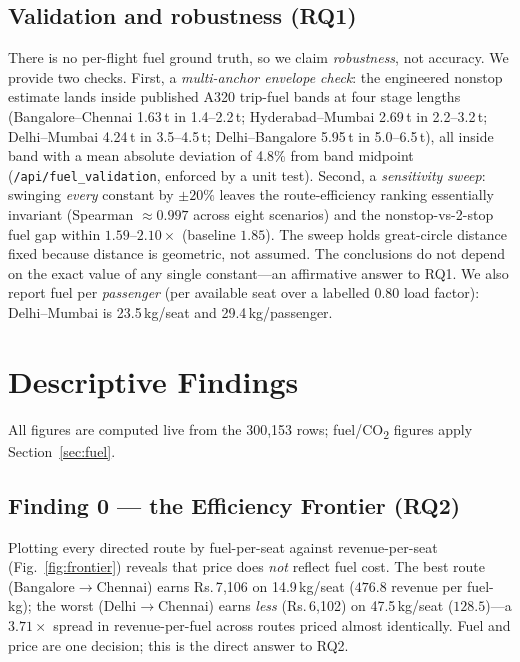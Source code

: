 \documentclass[conference]{IEEEtran}
\newcommand{\INR}{\mbox{Rs.}}
\newcommand{\co}{\mbox{CO\textsubscript{2}}}
\begin{document}
\subsection{Validation and robustness (RQ1)}
There is no per-flight fuel ground truth, so we claim \emph{robustness}, not accuracy. We provide two checks. First, a \emph{multi-anchor envelope check}: the engineered nonstop estimate lands inside published A320 trip-fuel bands at four stage lengths (Bangalore--Chennai 1.63\,t in 1.4--2.2\,t; Hyderabad--Mumbai 2.69\,t in 2.2--3.2\,t; Delhi--Mumbai 4.24\,t in 3.5--4.5\,t; Delhi--Bangalore 5.95\,t in 5.0--6.5\,t), all inside band with a mean absolute deviation of 4.8\% from band midpoint (\texttt{/api/fuel\_validation}, enforced by a unit test). Second, a \emph{sensitivity sweep}: swinging \emph{every} constant by $\pm20\%$ leaves the route-efficiency ranking essentially invariant (Spearman $\approx 0.997$ across eight scenarios) and the nonstop-vs-2-stop fuel gap within $1.59$--$2.10\times$ (baseline $1.85$). The sweep holds great-circle distance fixed because distance is geometric, not assumed. The conclusions do not depend on the exact value of any single constant---an affirmative answer to RQ1. We also report fuel per \emph{passenger} (per available seat over a labelled 0.80 load factor): Delhi--Mumbai is 23.5\,kg/seat and 29.4\,kg/passenger.

\section{Descriptive Findings}
All figures are computed live from the 300{,}153 rows; fuel/\co{} figures apply Section~\ref{sec:fuel}.

\subsection{Finding 0 --- the Efficiency Frontier (RQ2)}
Plotting every directed route by fuel-per-seat against revenue-per-seat (Fig.~\ref{fig:frontier}) reveals that price does \emph{not} reflect fuel cost. The best route (Bangalore$\to$Chennai) earns \INR{}\,7{,}106 on 14.9\,kg/seat ($476.8$ revenue per fuel-kg); the worst (Delhi$\to$Chennai) earns \emph{less} (\INR{}\,6{,}102) on 47.5\,kg/seat ($128.5$)---a $3.71\times$ spread in revenue-per-fuel across routes priced almost identically. Fuel and price are one decision; this is the direct answer to RQ2.
\end{document}
